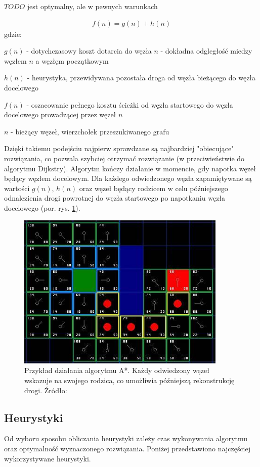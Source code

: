 $TODO$ jest optymalny, ale w pewnych warunkach

\begin{gather}
 	f(n) = g(n) + h(n)
 	\label{eq_astar} 
\end{gather}
 gdzie:

 $g(n)$ - dotychczasowy koszt dotarcia do węzła $n$ - dokładna odgległość miedzy węzłem $n$ a węzłęm początkowym

 $h(n)$ - heurystyka, przewidywana pozostała droga od węzła bieżącego do węzła docelowego

 $f(n)$ - oszacowanie pełnego kosztu ścieżki od węzła startowego do węzła docelowego prowadzącej przez węzeł $n$

 $n$ - bieżący węzeł, wierzchołek przeszukiwanego grafu

Dzięki takiemu podejściu najpierw sprawdzane są najbardziej "obiecujące" rozwiązania, co pozwala szybciej otrzymać rozwiązanie (w przeciwieństwie do algorytmu Dijkstry).
Algorytm kończy działanie w momencie, gdy napotka węzeł będący węzłem docelowym.
Dla każdego odwiedzonego węzła zapamiętywane są wartości $g(n)$, $h(n)$ oraz węzeł będący rodzicem w celu późniejszego odnalezienia drogi powrotnej do węzła startowego po napotkaniu węzła docelowego (por. rys. \ref{fig:image_astar2}).

\begin{figure}[H]
	\centering
	\includegraphics[width=10cm]{img/astar-t7}
	\caption{Przykład działania algorytmu A*. Każdy odwiedzony węzeł wskazuje na swojego rodzica, co umożliwia późniejszą rekonstrukcję drogi. Źródło: \cite{astar2}}
	\label{fig:image_astar2}
\end{figure}

\subsection{Heurystyki}
Od wyboru sposobu obliczania heurystyki zależy czas wykonywania algorytmu oraz optymalność wyznaczonego rozwiązania.
Poniżej przedstawiono najczęściej wykorzystywane heurystyki.

